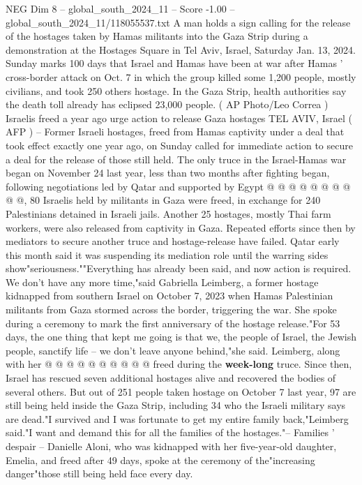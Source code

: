 \begin{textsample}{NEG Dim 8 – global\_south\_2024\_11 – Score -1.00 – global\_south\_2024\_11/118055537.txt}  \label{ex:f8_neg_292}
A man holds a sign calling for the release of the hostages taken by Hamas militants into the Gaza Strip during a demonstration at the Hostages Square in Tel Aviv, Israel, Saturday Jan. 13, 2024.
Sunday marks 100 days that Israel and Hamas have been at war after Hamas ' cross-border attack on Oct. 7 in which the group killed some 1,200 people, mostly civilians, and took 250 others hostage.
In the Gaza Strip, health authorities say the death toll already has eclipsed 23,000 people. ( AP Photo/Leo Correa ) Israelis freed a year ago urge action to release Gaza hostages TEL AVIV, Israel ( AFP ) -- Former Israeli hostages, freed from Hamas captivity under a deal that took effect exactly one year ago, on Sunday called for immediate action to secure a deal for the release of those still held.
The only truce in the Israel-Hamas war began on November 24 last year, less than two months after fighting began, following negotiations led by Qatar and supported by Egypt @ @ @ @ @ @ @ @ @ @, 80 Israelis held by militants in Gaza were freed, in exchange for 240 Palestinians detained in Israeli jails.
Another 25 hostages, mostly Thai farm workers, were also released from captivity in Gaza.
Repeated efforts since then by mediators to secure another truce and hostage-release have failed.
Qatar early this month said it was suspending its mediation role until the warring sides show"seriousness.""Everything has already been said, and now action is required.
We don't have any more time,"said Gabriella Leimberg, a former hostage kidnapped from southern Israel on October 7, 2023 when Hamas Palestinian militants from Gaza stormed across the border, triggering the war.
She spoke during a ceremony to mark the first anniversary of the hostage release."For 53 days, the one thing that kept me going is that we, the people of Israel, the Jewish people, sanctify life -- we don't leave anyone behind,"she said.
Leimberg, along with her @ @ @ @ @ @ @ @ @ @ freed during the \textbf{week-long} truce.
Since then, Israel has rescued seven additional hostages alive and recovered the bodies of several others.
But out of 251 people taken hostage on October 7 last year, 97 are still being held inside the Gaza Strip, including 34 who the Israeli military says are dead."I survived and I was fortunate to get my entire family back,"Leimberg said."I want and demand this for all the families of the hostages."-- Families ' despair -- Danielle Aloni, who was kidnapped with her five-year-old daughter, Emelia, and freed after 49 days, spoke at the ceremony of the"increasing danger"those still being held face every day.

\end{textsample}
